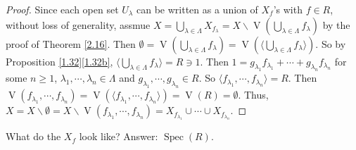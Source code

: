 \begin{proof}
    Since each open set $U_\lambda$ can be written as a union of $X_f$'s with $f \in R$, without loss of generality, assmue $X = \bigcup_{\lambda \in \Lambda} X_{f_\lambda} = X \smallsetminus \operatorname{V}(\bigcup_{\lambda \in \Lambda}f_{\lambda})$ by the proof of Theorem \ref{2.16}. Then $\emptyset = \operatorname{V}(\bigcup_{\lambda \in \Lambda}f_{\lambda}) = \operatorname{V}(\langle \bigcup_{\lambda \in \Lambda}f_{\lambda} \rangle)$. So by Proposition \ref{1.32}\ref{1.32b}, $\langle \bigcup_{\lambda \in \Lambda}f_{\lambda} \rangle = R \ni 1$. Then $1 = g_{\lambda_1} f_{\lambda_1} + \cdots + g_{\lambda_n}f_{\lambda_n}$ for some $n \geq 1$, $\lambda_1,\cdots,\lambda_n \in \Lambda$ and $g_{\lambda_1},\cdots,g_{\lambda_n} \in R$. So $\langle f_{\lambda_1},\cdots,f_{\lambda_n} \rangle = R$. Then $\operatorname{V}(f_{\lambda_1},\cdots,f_{\lambda_n}) = \operatorname{V}(\langle f_{\lambda_1},\cdots,f_{\lambda_n} \rangle) = \operatorname{V}(R) = \emptyset$. Thus, $X = X \smallsetminus \emptyset = X \smallsetminus \operatorname{V}(f_{\lambda_1},\cdots,f_{\lambda_n}) = X_{f_{\lambda_1}} \cup \cdots \cup X_{f_{\lambda_n}}$.
\end{proof}

\begin{question*}
    What do the $X_f$ look like? Answer: $\operatorname{Spec}(R)$.
\end{question*}

